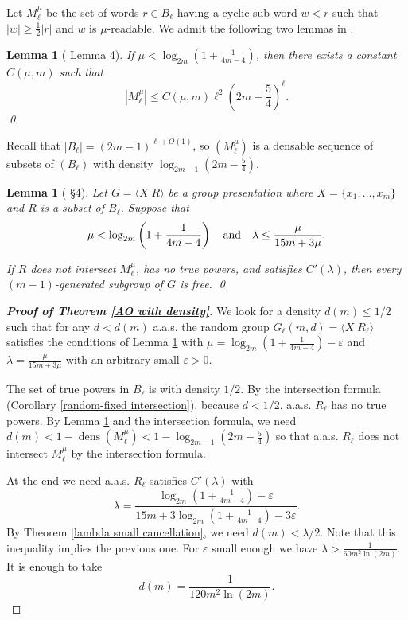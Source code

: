 \documentclass{article}
\DeclareMathOperator{\dens}{dens}
\newtheorem{lem}[thm]{Lemma}
\theoremstyle{remark}
\begin{document}
Let $M_\ell^\mu$ be the set of words $r\in B_\ell$ having a cyclic sub-word $w<r$ such that $|w|\geq \frac{1}{2}|r|$ and $w$ is $\mu$-readable. We admit the following two lemmas in \cite{AO96}.
\begin{lem}[\cite{AO96} Lemma 4] \label{density mu readable} If $\mu < \log_{2m}\left(1+\frac{1}{4m-4}\right)$, then there exists a constant $C(\mu,m)$ such that
\[|M_\ell^\mu| \leq C(\mu,m)\ell^2\left(2m-\frac{5}{4}\right)^\ell.\] \qed
\end{lem}

Recall that $|B_\ell| = (2m-1)^{\ell+O(1)}$, so $(M_\ell^\mu)$ is a densable sequence of subsets of $(B_\ell)$ with density $\log_{2m-1}\left(2m-\frac{5}{4}\right)$.

\begin{lem}[\cite{AO96} \S4]\label{lambda-mu condition} Let $G = \langle X|R\rangle$ be a group presentation where $X = \{x_1,\dots,x_m\}$ and $R$ is a subset of $B_\ell$. Suppose that \[\mu < \log_{2m}\left(1+\frac{1}{4m-4}\right) \textup{\quad and\quad} \lambda\leq \frac{\mu}{15m+3\mu}.\] 

If $R$ does not intersect $M_\ell^\mu$, has no true powers, and satisfies $C'(\lambda)$, then every $(m-1)$-generated subgroup of $G$ is free. \qed
\end{lem}\quad

\begin{proof}[\textbf{Proof of Theorem \ref{AO with density}}] We look for a density $d(m)\leq 1/2$ such that for any $d<d(m)$ a.a.s. the random group $G_\ell(m,d) = \langle X| R_\ell \rangle$ satisfies the conditions of Lemma \ref{lambda-mu condition} with $\mu = \log_{2m} \left(1+\frac{1}{4m-4}\right)-\varepsilon$ and $\lambda = \frac{\mu}{15m+3\mu}$ with an arbitrary small $\varepsilon>0$. 

The set of true powers in $B_\ell$ is with density $1/2$. By the intersection formula (Corollary \ref{random-fixed intersection}), because $d<1/2$, a.a.s. $R_\ell$ has no true powers. By Lemma \ref{density mu readable} and the intersection formula, we need $d(m) < 1 - \dens(M_\ell^\mu) <1 - \log_{2m-1}\left(2m-\frac{5}{4}\right)$ so that a.a.s. $R_\ell$ does not intersect $M_\ell^\mu$ by the intersection formula.  

At the end we need a.a.s. $R_\ell$ satisfies $C'(\lambda)$ with
\[\lambda = \frac{\log_{2m}\left(1+\frac{1}{4m-4}\right)-\varepsilon}{15m+3\log_{2m}\left(1+\frac{1}{4m-4}\right)-3\varepsilon}.\]
By Theorem \ref{lambda small cancellation}, we need $d(m)<\lambda/2$. Note that this inequality implies the previous one. For $\varepsilon$ small enough we have $\lambda > \frac{1}{60m^2\ln(2m)}$. It is enough to take \[d(m)=\frac{1}{120m^2\ln(2m)}.\]
\end{proof}
\end{document}
